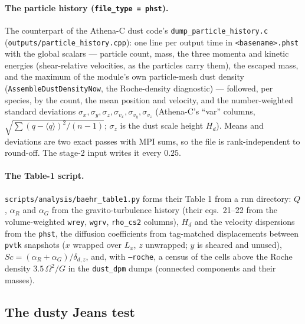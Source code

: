 \documentclass[11pt]{article}
\newcommand{\code}[1]{\texttt{#1}}
\newcommand{\file}[1]{\texttt{\small #1}}
\newcommand{\fn}[1]{\texttt{\small #1}}
\begin{document}
\paragraph{The particle history (\code{file\_type = phst}).} The counterpart of the
Athena-C dust code's \file{dump\_particle\_history.c}
(\file{outputs/particle\_history.cpp}): one line per output time in
\file{<basename>.phst} with the global scalars --- particle count, mass, the three
momenta and kinetic energies (shear-relative velocities, as the particles carry them),
the escaped mass, and the maximum of the module's own particle-mesh dust density
(\fn{AssembleDustDensityNow}, the Roche-density diagnostic) --- followed, per species,
by the count, the mean position and velocity, and the number-weighted standard
deviations $\sigma_x, \sigma_y, \sigma_z, \sigma_{v_x}, \sigma_{v_y}, \sigma_{v_z}$
(Athena-C's ``var'' columns, $\sqrt{\sum(q-\langle q\rangle)^2/(n-1)}$; $\sigma_z$ is the
dust scale height $H_d$). Means and deviations are two exact passes with MPI sums, so
the file is rank-independent to round-off. The stage-2 input writes it every $0.25$.

\paragraph{The Table-1 script.} \file{scripts/analysis/baehr\_table1.py} forms their
Table 1 from a run directory: $Q$, $\alpha_R$ and $\alpha_G$ from the gravito-turbulence
history (their eqs.\ 21--22 from the volume-weighted \code{wrey}, \code{wgrv},
\code{rho\_cs2} columns), $H_d$ and the velocity dispersions from the \code{phst},
the diffusion coefficients from tag-matched displacements between \code{pvtk}
snapshots ($x$ wrapped over $L_x$, $z$ unwrapped; $y$ is sheared and unused),
$Sc = (\alpha_R+\alpha_G)/\delta_{d,z}$, and, with \code{--roche}, a census of the
cells above the Roche density $3.5\,\Omega^2/G$ in the \code{dust\_dpm} dumps
(connected components and their masses).

\subsection{The dusty Jeans test}
\end{document}

